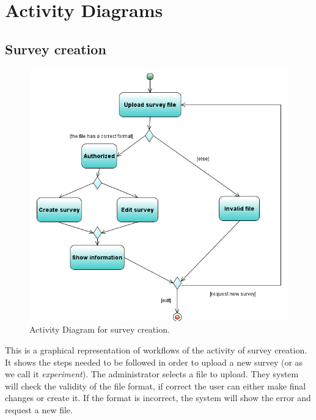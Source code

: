 \documentclass[a4paper,12pt,oneside]{report}
\begin{document}

\newpage

\section{Activity Diagrams}
\subsection {Survey creation}
\begin{figure}[h!]
  \begin{center}
   \includegraphics[width=13.5cm]{pics/Activity.png}
  \end{center}
\caption{Activity Diagram for survey creation.}
\end{figure}
This is a graphical representation of workflows of the activity of survey creation. It shows the steps needed to be followed in order to upload a new survey (or as we call it \emph{experiment}). The administrator selects a file to upload. They system will check the validity of the file format, if correct the user can either make final changes or create it. If the format is incorrect, the system will show the error and request a new file.
\newpage
\end{document}

